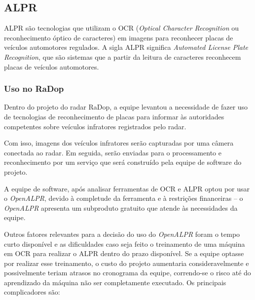 

\subsection{ALPR}

ALPR são tecnologias que utilizam o OCR (\textit{Optical Character Recognition} ou reconhecimento óptico de caracteres) em imagens para reconhecer placas de veículos automotores regulados. A sigla ALPR significa \textit{Automated License Plate Recognition}, que são sistemas que a partir da leitura de caracteres reconhecem placas de veículos automotores.

\subsubsection{Uso no RaDop}

Dentro do projeto do radar RaDop, a equipe levantou a necessidade de fazer uso de tecnologias de reconhecimento de placas para informar às autoridades competentes sobre veículos infratores registrados pelo radar.

Com isso, imagens dos veículos infratores serão capturadas por uma câmera conectada ao radar. Em seguida, serão enviadas para o processamento e reconhecimento por um serviço que será construído pela equipe de software do projeto.

A equipe de software, após analisar ferramentas de OCR e ALPR optou por usar o \textit{OpenALPR}, devido à completude da ferramenta e à restrições financeiras -- o \textit{OpenALPR} apresenta um subproduto gratuito que atende às necessidades da equipe.

Outros fatores relevantes para a decisão do uso do \textit{OpenALPR} foram o tempo curto disponível e as dificuldades caso seja feito o treinamento de uma máquina em OCR para realizar o ALPR dentro do prazo disponível. Se a equipe optasse por realizar esse treinamento, o custo do projeto aumentaria consideravelmente e possivelmente teriam atrasos no cronograma da equipe, correndo-se o risco até do aprendizado da máquina não ser completamente executado. Os principais complicadores são:

